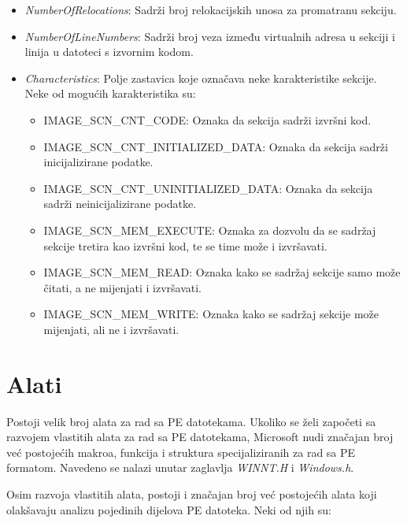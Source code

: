 \documentclass[times, utf8, diplomski, numeric]{fer}
\begin{document}
\begin{itemize}
\item \emph{NumberOfRelocations}: Sadrži broj relokacijskih unosa
za promatranu sekciju.

\item \emph{NumberOfLineNumbers}: Sadrži broj veza između
virtualnih adresa u sekciji i linija u datoteci s izvornim kodom.

\item \emph{Characteristics}: Polje zastavica koje označava neke
karakteristike sekcije. Neke od mogućih karakteristika su:

\begin{itemize}
\item IMAGE\_SCN\_CNT\_CODE: Oznaka da sekcija
sadrži izvršni kod.

\item IMAGE\_SCN\_CNT\_INITIALIZED\_DATA:
Oznaka da sekcija sadrži inicijalizirane podatke.

\item IMAGE\_SCN\_CNT\_UNINITIALIZED\_DATA: Oznaka da sekcija sadrži
neinicijalizirane podatke.

\item IMAGE\_SCN\_MEM\_EXECUTE: Oznaka za dozvolu da se sadržaj
sekcije tretira kao izvršni kod, te se time može i izvršavati.

\item IMAGE\_SCN\_MEM\_READ: Oznaka kako se sadržaj sekcije samo
može čitati, a ne mijenjati i izvršavati.

\item IMAGE\_SCN\_MEM\_WRITE: Oznaka kako se sadržaj
sekcije može mijenjati, ali ne i izvršavati.
\end{itemize}

\end{itemize}



\section{Alati}									%

Postoji velik broj alata za rad sa PE datotekama. Ukoliko se želi
započeti sa razvojem vlastitih alata za rad sa PE datotekama,
Microsoft nudi značajan broj već postojećih makroa, funkcija i
struktura specijaliziranih za rad sa PE formatom. Navedeno se
nalazi unutar zaglavlja \emph{WINNT.H} i \emph{Windows.h}.

Osim razvoja vlastitih alata, postoji i značajan broj već
postojećih alata koji olakšavaju analizu pojedinih dijelova PE
datoteka. Neki od njih su:
\end{document}
